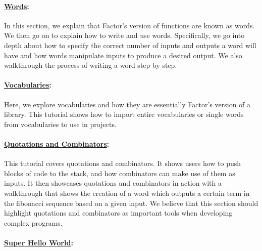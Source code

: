 \documentclass[
]{article}
\begin{document}
\hypertarget{words}{%
\paragraph{\texorpdfstring{\href{https://factor.netlify.app/book/words.md}{Words}:}{Words:}}\label{words}}

In this section, we explain that Factor's version of functions are known
as words. We then go on to explain how to write and use words.
Specifically, we go into depth about how to specify the correct number
of inputs and outputs a word will have and how words manipulate inputs
to produce a desired output. We also walkthrough the process of writing
a word step by step.

\hypertarget{vocabularies}{%
\paragraph{\texorpdfstring{\href{https://factor.netlify.app/book/vocabularies.md}{Vocabularies}:}{Vocabularies:}}\label{vocabularies}}

Here, we explore vocabularies and how they are essentially Factor's
version of a library. This tutorial shows how to import entire
vocabularies or single words from vocabularies to use in projects.

\hypertarget{quotations-and-combinators}{%
\paragraph{\texorpdfstring{\href{https://factor.netlify.app/book/quotations_combinators.md}{Quotations
and
Combinators}:}{Quotations and Combinators:}}\label{quotations-and-combinators}}

This tutorial covers quotations and combinators. It shows users how to
push blocks of code to the stack, and how combinators can make use of
them as inputs. It then showcases quotations and combinators in action
with a walkthrough that shows the creation of a word which outputs a
certain term in the fibonacci sequence based on a given input. We
believe that this section should highlight quotations and combinators as
important tools when developing complex programs.

\hypertarget{super-hello-world}{%
\paragraph{\texorpdfstring{\href{https://factor.netlify.app/book/Super_Hello_World.md}{Super
Hello World}:}{Super Hello World:}}\label{super-hello-world}}
\end{document}

